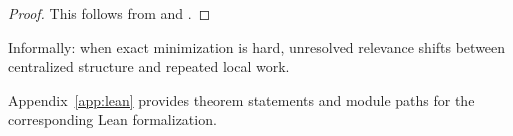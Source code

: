 \begin{proof}
This follows from  and .
\end{proof}

Informally: when exact minimization is hard, unresolved relevance shifts between centralized structure and repeated local work.

Appendix~\ref{app:lean} provides theorem statements and module paths for the corresponding Lean formalization.
